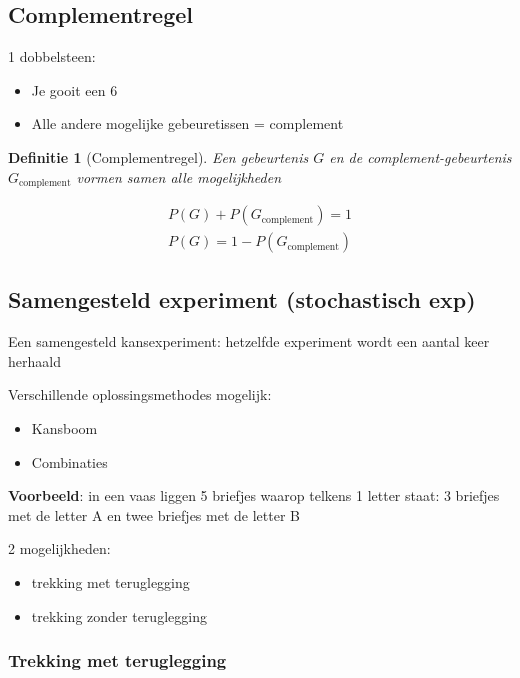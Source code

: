 \documentclass{article}
\newtheorem{theorem}{Definitie}[section]
\begin{document}
\subsection{Complementregel}

1 dobbelsteen:

\begin{itemize}
    \item Je gooit een 6
    \item Alle andere mogelijke gebeuretissen = complement
\end{itemize}

\begin{theorem}[Complementregel]
    Een gebeurtenis $G$ en de complement-gebeurtenis $G_{\text{complement}}$ vormen samen alle mogelijkheden

    \begin{equation}
        \begin{aligned}
            P(G) + P(G_{\text{complement}}) = 1\\
            P(G) = 1 - P(G_{\text{complement}})
        \end{aligned}
    \end{equation}
\end{theorem}

\subsection{Samengesteld experiment (stochastisch exp)}

Een samengesteld kansexperiment: hetzelfde experiment wordt een aantal keer herhaald

Verschillende oplossingsmethodes mogelijk:

\begin{itemize}
    \item Kansboom
    \item Combinaties
\end{itemize}

\textbf{Voorbeeld}: in een vaas liggen 5 briefjes waarop telkens 1 letter staat: 3 briefjes met de letter A en twee briefjes met de letter B

2 mogelijkheden: 

\begin{itemize}
    \item trekking met teruglegging
    \item trekking zonder teruglegging
\end{itemize}

\subsubsection{Trekking met teruglegging}
\end{document}
